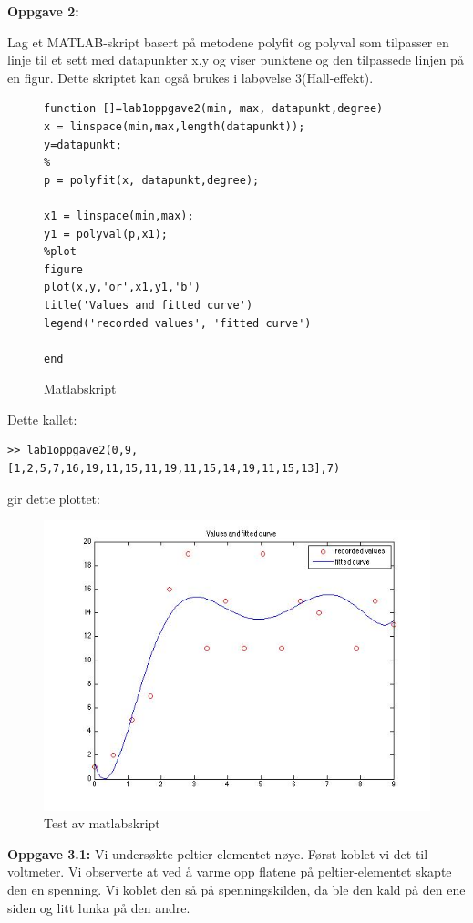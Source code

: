 \documentclass[12pt,a4paper,leqno]{report}
\begin{document}
\textbf{Oppgave 2:} 

Lag et MATLAB-skript basert på metodene polyfit og polyval som tilpasser en linje til et sett med datapunkter x,y og viser punktene og den tilpassede linjen på en figur. Dette skriptet kan også brukes i labøvelse 3(Hall-effekt).

\begin{figure}
\caption{Matlabskript}
\begin{verbatim}
function []=lab1oppgave2(min, max, datapunkt,degree)
x = linspace(min,max,length(datapunkt));
y=datapunkt;
%
p = polyfit(x, datapunkt,degree);

x1 = linspace(min,max);
y1 = polyval(p,x1);
%plot
figure
plot(x,y,'or',x1,y1,'b')
title('Values and fitted curve')
legend('recorded values', 'fitted curve')

end
\end{verbatim}
\end{figure}
Dette kallet: 
\begin{verbatim}
>> lab1oppgave2(0,9,[1,2,5,7,16,19,11,15,11,19,11,15,14,19,11,15,13],7)
\end{verbatim}
gir dette plottet:
\begin{figure}[H]
\caption{Test av matlabskript}
\centering
\includegraphics[width=\textwidth]{curvefittertest.jpg}
\end{figure}

\textbf{Oppgave 3.1:}
Vi undersøkte peltier-elementet nøye. Først koblet vi det til voltmeter. Vi observerte at ved å varme opp flatene på peltier-elementet skapte den en spenning. Vi koblet den så på spenningskilden, da ble den kald på den ene siden og litt lunka på den andre. 
\end{document}
